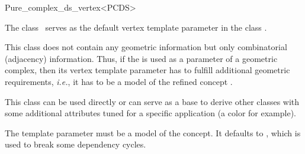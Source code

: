 \begin{ccRefClass}{Pure_complex_ds_vertex<PCDS>}

\ccDefinition

The class \ccRefName\ serves as the default vertex template parameter in the
class .

This class does not contain any geometric information but only combinatorial
(adjacency) information. Thus, if the  is
used as a parameter of a geometric complex, then its vertex template parameter
has to fulfill additional geometric requirements, \emph{i.e.}, it has to be a
model of the refined concept .

This class can be used directly or can serve as a base to derive other classes
with some additional attributes tuned for a specific application (a color for
example).


\ccParameters

The template parameter  must be a model of the
 concept. It defaults to , which is
used to break some dependency cycles.

\ccIsModel


\ccSeeAlso


\end{ccRefClass}
